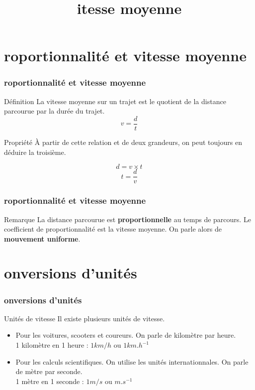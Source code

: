 \documentclass{beamer}
\title{\rmfamily{\textsc{V}}itesse moyenne}
\begin{document}
\frame{\titlepage}

\section{ roportionnalité et vitesse moyenne}
\begin{frame}
  \frametitle{roportionnalité et vitesse moyenne}

  \begin{alertblock}{Définition}
    La vitesse moyenne sur un trajet est le  quotient de la distance parcourue par la durée du trajet.
    $$v = \frac{d}{t}$$
  \end{alertblock}

  \begin{block}{Propriété}
    À partir de cette relation et de deux grandeurs, on peut toujours en déduire la troisième.
    \begin{multicols}{2}
      $$d = v \times t$$
      $$t = \frac{d}{v}$$
    \end{multicols}
  \end{block}
\end{frame}

\begin{frame}
  \frametitle{roportionnalité et vitesse moyenne}
  \begin{block}{Remarque}
    La distance parcourue est \textbf{proportionnelle} au temps de parcours. Le coefficient de proportionnalité est la vitesse moyenne. On parle alors de \textbf{mouvement uniforme}.
  \end{block}
\end{frame}



\section{onversions d'unités}
\begin{frame}
  \frametitle{onversions d'unités}

  \begin{block}{Unités de vitesse}
    Il existe plusieurs unités de vitesse. 

    \begin{itemize}
    \item Pour les voitures, scooters et coureurs. On parle de kilomètre par heure.\\
      1 kilomètre en 1 heure : $1km/h$ ou $1km.h^{-1}$
    \item Pour les calculs scientifiques. On utilise les unités internationnales. On parle de mètre par seconde.\\
      1 mètre en 1 seconde   : $1m/s$  ou $m.s^{-1}$ 
    \end{itemize}
  \end{block}
  
\end{frame}
\end{document}
